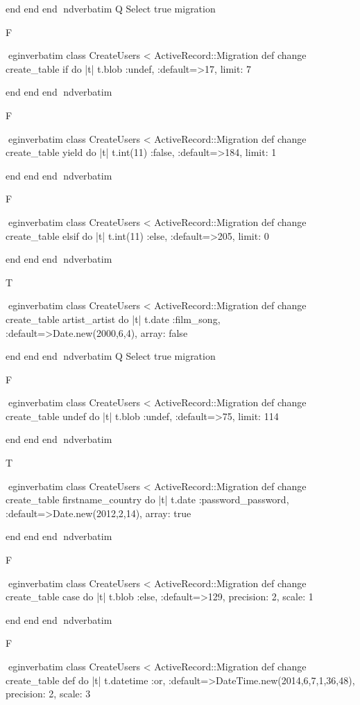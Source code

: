     end 
  end 
end
nd{verbatim}
Q
 Select true migration

F

egin{verbatim}
 class CreateUsers < ActiveRecord::Migration 
  def change 
    create_table if do |t| 
      t.blob :undef, :default=>17, limit: 7
    
    end 
  end 
end
nd{verbatim}

F

egin{verbatim}
 class CreateUsers < ActiveRecord::Migration 
  def change 
    create_table yield do |t| 
      t.int(11) :false, :default=>184, limit: 1
    
    end 
  end 
end
nd{verbatim}

F

egin{verbatim}
 class CreateUsers < ActiveRecord::Migration 
  def change 
    create_table elsif do |t| 
      t.int(11) :else, :default=>205, limit: 0
    
    end 
  end 
end
nd{verbatim}

T

egin{verbatim}
 class CreateUsers < ActiveRecord::Migration 
  def change 
    create_table artist_artist do |t| 
      t.date :film_song, :default=>Date.new(2000,6,4), array: false
    
    end 
  end 
end
nd{verbatim}
Q
 Select true migration

F

egin{verbatim}
 class CreateUsers < ActiveRecord::Migration 
  def change 
    create_table undef do |t| 
      t.blob :undef, :default=>75, limit: 114
    
    end 
  end 
end
nd{verbatim}

T

egin{verbatim}
 class CreateUsers < ActiveRecord::Migration 
  def change 
    create_table firstname_country do |t| 
      t.date :password_password, :default=>Date.new(2012,2,14), array: true
    
    end 
  end 
end
nd{verbatim}

F

egin{verbatim}
 class CreateUsers < ActiveRecord::Migration 
  def change 
    create_table case do |t| 
      t.blob :else, :default=>129, precision: 2, scale: 1
    
    end 
  end 
end
nd{verbatim}

F

egin{verbatim}
 class CreateUsers < ActiveRecord::Migration 
  def change 
    create_table def do |t| 
      t.datetime :or, :default=>DateTime.new(2014,6,7,1,36,48), precision: 2, scale: 3
    
